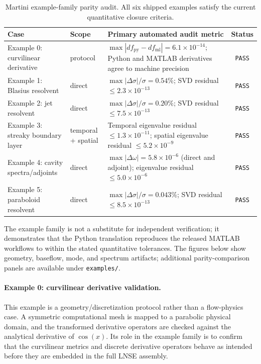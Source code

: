 \documentclass[11pt]{article}
\begin{document}
\begin{table}[t]
\centering
\scriptsize
\setlength{\tabcolsep}{4pt}
\begin{tabular}{L{3.0cm}L{1.8cm}L{6.0cm}c}
\toprule
Case & Scope & Primary automated audit metric & Status \\
\midrule
Example 0: curvilinear derivative & protocol & $\max|df_{\mathrm{py}}-df_{\mathrm{ml}}| = 6.1\times 10^{-14}$; Python and MATLAB derivatives agree to machine precision & \texttt{PASS} \\
Example 1: Blasius resolvent & direct & $\max|\Delta\sigma|/\sigma = 0.54\%$; SVD residual $\leq 2.3\times 10^{-13}$ & \texttt{PASS} \\
Example 2: jet resolvent & direct & $\max|\Delta\sigma|/\sigma = 0.20\%$; SVD residual $\leq 7.5\times 10^{-13}$ & \texttt{PASS} \\
Example 3: streaky boundary layer & temporal + spatial & Temporal eigenvalue residual $\leq 1.3\times 10^{-11}$; spatial eigenvalue residual $\leq 5.2\times 10^{-9}$ & \texttt{PASS} \\
Example 4: cavity spectra/adjoints & direct & $\max|\Delta\omega| = 5.8\times 10^{-6}$ (direct and adjoint); eigenvalue residual $\leq 5.0\times 10^{-6}$ & \texttt{PASS} \\
Example 5: paraboloid resolvent & direct & $\max|\Delta\sigma|/\sigma = 0.043\%$; SVD residual $\leq 8.5\times 10^{-13}$ & \texttt{PASS} \\
\bottomrule
\end{tabular}
\caption{Martini example-family parity audit. All six shipped examples satisfy
the current quantitative closure criteria.}
\label{tab:accuracy_gate}
\end{table}

The example family is not a substitute for independent verification;
it demonstrates that the Python translation reproduces the released MATLAB
workflows to within the stated quantitative tolerances. The figures below
show geometry, baseflow, mode, and spectrum artifacts; additional
parity-comparison panels are available under \texttt{examples/}.

\paragraph{Example 0: curvilinear derivative validation.}
This example is a geometry/discretization protocol rather than a flow-physics
case. A symmetric computational mesh is mapped to a parabolic physical domain,
and the transformed derivative operators are checked against the analytical
derivative of $\cos(x)$. Its role in the example family is to confirm that the
curvilinear metrics and discrete derivative operators behave as intended before
they are embedded in the full LNSE assembly.
\end{document}
